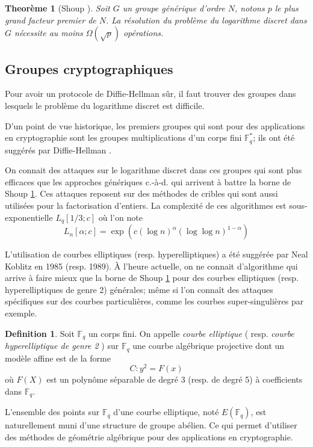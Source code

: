 \documentclass[a4paper]{article}
\newtheorem{theoreme}{Theorème}[section]
\theoremstyle{definition}
\newtheorem{definition}{Definition}[section]
\theoremstyle{remark}
\numberwithin{equation}{section}
\begin{document}
\begin{theoreme}[Shoup \cite{shoup}]
\label{borneShoup}
Soit $G$ un groupe générique d'ordre $N$, notons $p$ le plus grand facteur premier de $N$. La résolution du problème du logarithme discret dans $G$ nécessite au moins $\Omega(\sqrt{p})$ opérations. 
\end{theoreme}

\subsection{Groupes cryptographiques}
Pour avoir un protocole de Diffie-Hellman sûr, il faut trouver des groupes dans lesquels le problème du logarithme discret est difficile.

D'un point de vue historique, les premiers groupes qui sont pour des applications en cryptographie sont les groupes multiplications d'un corps fini $\mathbb{F}^*_q$; ils ont été suggérés par Diffie-Hellman \cite{diffie-hellman}.

On connait des attaques sur le logarithme discret dans ces groupes qui sont plus efficaces que les approches génériques c.-à-d. qui arrivent à battre la borne de Shoup \ref{borneShoup}. Ces attaques reposent sur des méthodes de cribles qui sont aussi utilisées pour la factorisation d'entiers. La complexité de ces algorithmes est sous-exponentielle $L_q[1/3;c]$ où l'on note
$$L_n[\alpha;c] = \exp(c(\log n)^\alpha(\log \log n)^{1-\alpha})$$

L'utilisation de courbes elliptiques (resp. hyperelliptiques) a été suggérée par Neal Koblitz \cite{koblitz1} \cite{koblitz2} en 1985 (resp. 1989). À l'heure actuelle, on ne connait d'algorithme qui arrive à faire mieux que la borne de Shoup \ref{borneShoup} pour des courbes elliptiques (resp. hyperelliptiques de genre 2) générales; même si l'on connaît des attaques spécifiques sur des courbes particulières, comme les courbes super-singulières par exemple.

\begin{definition}
Soit $\mathbb{F}_q$ un corps fini.
On appelle \emph{courbe elliptique} ( resp. \emph{courbe hyperelliptique de genre 2} ) sur $\mathbb{F}_q$ une courbe algébrique projective dont un modèle affine est de la forme
$$C : y^2 = F(x)$$
où $F(X)$ est un polynôme séparable de degré 3 (resp. de degré 5) à coefficients dans $\mathbb{F}_q$.
\end{definition}

L'ensemble des points sur $\mathbb{F}_q$ d'une courbe elliptique, noté $E(\mathbb{F}_q)$, est naturellement muni d'une structure de groupe abélien. Ce qui permet d'utiliser des méthodes de géométrie algébrique pour des applications en cryptographie.
\end{document}
